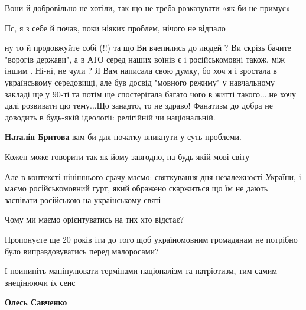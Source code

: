 \begin{itemize}
\begin{itemize}
Вони й добровільно не хотіли, так що не треба розказувати «як би не примус»

Пс, я з себе й почав, поки ніяких проблем, нічого не відпало

 

ну то й продовжуйте собі (!!) та що Ви вчепились до людей ? Ви скрізь бачите
"ворогів держави", а в АТО серед наших воїнів є і російськомовні також, між
іншим . Ні-ні, не чули ? Я Вам написала свою думку, бо хоч я і зростала в
українському середовищі, але був досвід "мовного режиму" у навчальному закладі
ще у 90-ті та потім ще спостерігала багато чого в житті такого....не хочу далі
розвивати цю тему...Що занадто, то не здраво! Фанатизм до добра не доводить в
будь-якій ідеології: релігійній чи національній.

 
\textbf{Наталія Бритова} вам би для початку вникнути у суть проблеми.

Кожен може говорити так як йому завгодно, на будь якій мові світу

Але в контексті нінішнього срачу маємо: святкування дня незалежності України, і
маємо російськомовний гурт, який ображено скаржиться що їм не дають заспівати
російською на українському святі

Чому ми маємо орієнтуватись на тих хто відстає?

Пропонуєте ще 20 років іти до того щоб україномовним громадянам не потрібно
було виправдовуватись перед малоросами?

І поипиніть маніпулювати термінами націоналізм та патріотизм, тим самим
знецінюючи їх сенс

 
\textbf{Олесь Савченко} 


\end{itemize}
\end{itemize}
